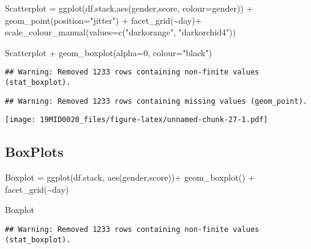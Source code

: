 \documentclass[
]{article}
\newenvironment{Shaded}{\begin{snugshade}}{\end{snugshade}}
\newcommand{\AttributeTok}[1]{\textcolor[rgb]{0.77,0.63,0.00}{#1}}
\newcommand{\DecValTok}[1]{\textcolor[rgb]{0.00,0.00,0.81}{#1}}
\newcommand{\FunctionTok}[1]{\textcolor[rgb]{0.00,0.00,0.00}{#1}}
\newcommand{\NormalTok}[1]{#1}
\newcommand{\OtherTok}[1]{\textcolor[rgb]{0.56,0.35,0.01}{#1}}
\newcommand{\SpecialCharTok}[1]{\textcolor[rgb]{0.00,0.00,0.00}{#1}}
\newcommand{\StringTok}[1]{\textcolor[rgb]{0.31,0.60,0.02}{#1}}
\begin{document}
\begin{Shaded}
\begin{Highlighting}[]
\NormalTok{Scatterplot }\OtherTok{=} \FunctionTok{ggplot}\NormalTok{(df.stack,}\FunctionTok{aes}\NormalTok{(gender,score, }\AttributeTok{colour=}\NormalTok{gender)) }\SpecialCharTok{+} 
              \FunctionTok{geom\_point}\NormalTok{(}\AttributeTok{position=}\StringTok{"jitter"}\NormalTok{) }\SpecialCharTok{+} 
              \FunctionTok{facet\_grid}\NormalTok{(}\SpecialCharTok{\textasciitilde{}}\NormalTok{day)}\SpecialCharTok{+}
              \FunctionTok{scale\_colour\_manual}\NormalTok{(}\AttributeTok{values=}\FunctionTok{c}\NormalTok{(}\StringTok{"darkorange"}\NormalTok{, }\StringTok{"darkorchid4"}\NormalTok{))}

\NormalTok{Scatterplot }\SpecialCharTok{+} \FunctionTok{geom\_boxplot}\NormalTok{(}\AttributeTok{alpha=}\DecValTok{0}\NormalTok{, }\AttributeTok{colour=}\StringTok{"black"}\NormalTok{)}
\end{Highlighting}
\end{Shaded}

\begin{verbatim}
## Warning: Removed 1233 rows containing non-finite values (stat_boxplot).
\end{verbatim}

\begin{verbatim}
## Warning: Removed 1233 rows containing missing values (geom_point).
\end{verbatim}

\texttt{[image: 19MID0020\_files/figure-latex/unnamed-chunk-27-1.pdf]}

\hypertarget{boxplots}{%
\subsection{BoxPlots}\label{boxplots}}

\begin{Shaded}
\begin{Highlighting}[]
\NormalTok{Boxplot }\OtherTok{=} \FunctionTok{ggplot}\NormalTok{(df.stack, }\FunctionTok{aes}\NormalTok{(gender,score))}\SpecialCharTok{+}
          \FunctionTok{geom\_boxplot}\NormalTok{() }\SpecialCharTok{+} 
          \FunctionTok{facet\_grid}\NormalTok{(}\SpecialCharTok{\textasciitilde{}}\NormalTok{day)}

\NormalTok{Boxplot}
\end{Highlighting}
\end{Shaded}

\begin{verbatim}
## Warning: Removed 1233 rows containing non-finite values (stat_boxplot).
\end{verbatim}
\end{document}
